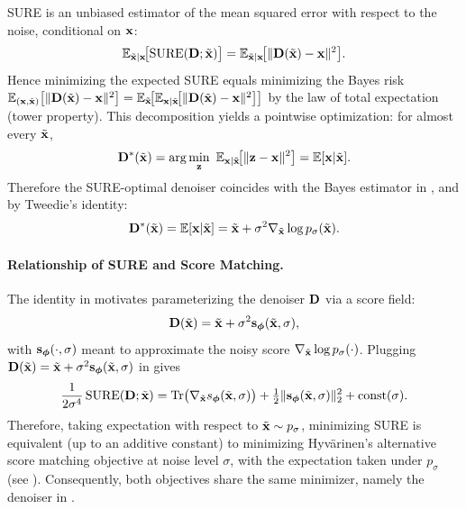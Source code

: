 SURE is an unbiased estimator of the mean squared error with respect to the noise, conditional on ${\mathbf{x}}$:
\[
\mathbb{E}_{\tilde{{\mathbf{x}}}| {\mathbf{x}}}\!\big[\mathrm{SURE}({\mathbf{D}}; \tilde{{\mathbf{x}}})\big]
=
\mathbb{E}_{\tilde{{\mathbf{x}}}| {\mathbf{x}}}\!\big[\|{\mathbf{D}}(\tilde{{\mathbf{x}}})-{\mathbf{x}}\|^2\big].
\]
Hence minimizing the expected SURE equals minimizing the Bayes risk
$\mathbb{E}_{({\mathbf{x}}, \tilde{{\mathbf{x}}})}\big[\|{\mathbf{D}}(\tilde{{\mathbf{x}}})-{\mathbf{x}}\|^2\big]
=\mathbb{E}_{\tilde{{\mathbf{x}}}}\!\big[\mathbb{E}_{{\mathbf{x}}| \tilde{{\mathbf{x}}}}\!\big[\|{\mathbf{D}}(\tilde{{\mathbf{x}}})-{\mathbf{x}}\|^2\big]\big]$ by the law of total expectation (tower property). This decomposition yields a pointwise optimization: for almost every $\tilde{{\mathbf{x}}}$,
\[
{\mathbf{D}}^*(\tilde{{\mathbf{x}}})
=\arg\min_{\mathbf z}\ \mathbb{E}_{{\mathbf{x}}| \tilde{{\mathbf{x}}}}\!\big[\|\mathbf z-{\mathbf{x}}\|^2\big]
=\mathbb{E}[{\mathbf{x}}| \tilde{{\mathbf{x}}}].
\]
Therefore the SURE-optimal denoiser coincides with the Bayes estimator in , and by Tweedie’s identity:
\begin{align}\label{eq:sure-tweedie-denoiser}
    {\mathbf{D}}^*(\tilde{{\mathbf{x}}})=\mathbb{E}[{\mathbf{x}}| \tilde{{\mathbf{x}}}]=\tilde{{\mathbf{x}}}+\sigma^2\nabla_{\tilde{{\mathbf{x}}}}\log p_\sigma(\tilde{{\mathbf{x}}}).
\end{align}




\paragraph{Relationship of SURE and Score Matching.}
The identity in  motivates parameterizing the denoiser ${\mathbf{D}}$ via a score field:
\[
{\mathbf{D}}(\tilde{{\mathbf{x}}})=\tilde{{\mathbf{x}}}+\sigma^2{\mathbf{s}}_{\bm\phi}(\tilde{{\mathbf{x}}}, \sigma),
\]
with ${\mathbf{s}}_{\bm\phi}(\cdot, \sigma)$ meant to approximate the noisy score
$\nabla_{\tilde{{\mathbf{x}}}}\log p_\sigma(\cdot)$.
Plugging  ${\mathbf{D}}(\tilde{{\mathbf{x}}})=\tilde{{\mathbf{x}}}+\sigma^2 {\mathbf{s}}_{\bm\phi}(\tilde{{\mathbf{x}}}, \sigma)$ in  gives
\[
\frac{1}{2\sigma^4}\,\mathrm{SURE}({\mathbf{D}};\tilde{{\mathbf{x}}})
=
\operatorname{Tr}\!\big(\nabla_{\tilde{{\mathbf{x}}}} s_{\bm\phi}(\tilde{{\mathbf{x}}}, \sigma)\big)
+\tfrac12\|{\mathbf{s}}_{\bm\phi}(\tilde{{\mathbf{x}}}, \sigma)\|_2^2
+\text{const}(\sigma).
\]
Therefore, taking expectation with respect to $\tilde{{\mathbf{x}}}\sim p_\sigma$, minimizing SURE is
equivalent (up to an additive constant) to minimizing Hyv\"arinen’s alternative
score matching objective at noise level $\sigma$, with the expectation taken under $p_\sigma$ (see ).
Consequently, both objectives share the same minimizer, namely the denoiser in .



